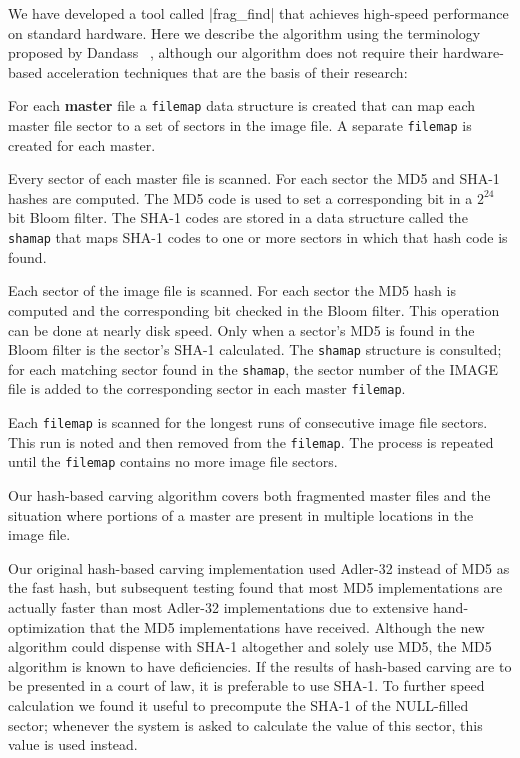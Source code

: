 \documentclass[11pt,letter]{article}
\begin{document}
\newcommand{\master}{\textbf{master}\xspace}
\newcommand{\filemap}{\texttt{filemap}\xspace}
\newcommand{\shamap}{\texttt{shamap}\xspace}
We have developed a tool called |frag_find| that achieves high-speed
performance on standard hardware. Here we describe the algorithm using
the terminology proposed by Dandass
\etal~\cite{dandass2008,collange2009}, although our algorithm 
does not require their hardware-based acceleration techniques that
are the basis of their research:

\begin{compactenum}
\item For each \master file a \filemap data structure is created that
  can map each master file sector to a set of sectors in the image
  file. A separate \filemap is created for each master.
\item Every sector of each master file is scanned. For each sector the
  MD5 and SHA-1 hashes are computed. The
MD5 code is used to set a corresponding bit in a $2^{24}$ bit
Bloom filter. The SHA-1 codes are stored in a data structure called
the \shamap that maps SHA-1 codes to one or more sectors in which that
hash code is found. 
\item Each sector of the image file is scanned. For each sector
  the MD5 hash is computed and the corresponding bit checked in
  the Bloom filter. This operation can be done at nearly disk
  speed. Only when a sector's MD5 is found in the Bloom filter is
  the sector's SHA-1 calculated. The \shamap structure is consulted;
  for each matching sector found in the \shamap, the sector number of
  the IMAGE file is added to the corresponding
  sector in each master \filemap.
\item Each \filemap is scanned for the longest runs of
  consecutive image file sectors. This run is noted and then removed from
  the \filemap. The process is repeated until the \filemap contains no
  more image file sectors. 
\end{compactenum}

Our hash-based carving algorithm covers both fragmented master files and the
situation where portions of a master are present in multiple locations
in the image file.

Our original hash-based carving implementation used
Adler-32\cite{RFC1950} instead of MD5 as the fast hash, but subsequent
testing found that most MD5 implementations are actually faster than
most Adler-32 implementations due to extensive hand-optimization that
the MD5 implementations have received. Although the new algorithm
could dispense with SHA-1 altogether and solely use MD5, the MD5
algorithm is known to have deficiencies. If the results of hash-based
carving are to be presented in a court of law, it is preferable to use
SHA-1. To further speed calculation we found it useful to precompute
the SHA-1 of the NULL-filled sector; whenever the system is asked to
calculate the value of this sector, this value is used instead.
\end{document}
